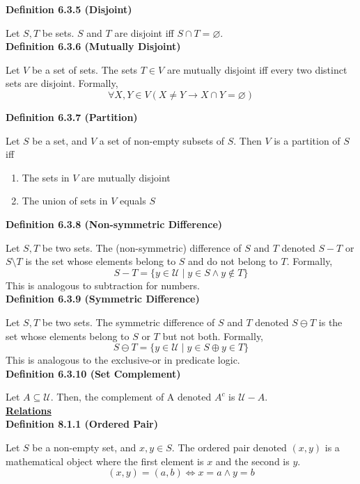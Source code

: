 \documentclass[a4paper]{article}
\newcommand{\heading}[1]{{\small\underline{\textbf{#1}}}}
\newcommand{\subheading}[1]{{\scriptsize\textbf{#1}}}
\begin{document}
\begin{multicols*}{4}
\subheading{Definition 6.3.5 (Disjoint)}

Let $S, T$ be sets. $S$ and $T$ are disjoint iff $S \cap T = \varnothing$.\\

\subheading{Definition 6.3.6 (Mutually Disjoint)}

Let $V$ be a set of sets. The sets $T \in V$ are mutually disjoint iff every two
distinct sets are disjoint. Formally,
$$\forall X, Y \in V (X \neq Y \rightarrow X \cap Y = \varnothing)$$

\subheading{Definition 6.3.7 (Partition)}

Let $S$ be a set, and $V$ a set of non-empty subsets of $S$. Then $V$ is a
partition of $S$ iff
\begin{enumerate} \itemsep -0.5em
  \item The sets in $V$ are mutually disjoint
  \item The union of sets in $V$ equals $S$
\end{enumerate}

\subheading{Definition 6.3.8 (Non-symmetric Difference)}

Let $S, T$ be two sets. The (non-symmetric) difference of $S$ and $T$ denoted
$S-T$ or $S\setminus T$ is the set whose elements belong to $S$ and do not
belong to $T$. Formally,
$$S - T = \{y \in \mathcal{U}\;|\;y \in S \land y \not\in T \}$$
This is analogous to subtraction for numbers.\\

\subheading{Definition 6.3.9 (Symmetric Difference)}

Let $S, T$ be two sets. The symmetric difference of $S$ and $T$ denoted $S
\ominus T$ is the set whose elements belong to $S$ or $T$ but not both.
Formally,
$$S \ominus T = \{y \in \mathcal{U}\;|\;y \in S \oplus y \in T \}$$
This is analogous to the exclusive-or in predicate logic.\\

\subheading{Definition 6.3.10 (Set Complement)}

Let $A \subseteq \mathcal{U}$. Then, the complement of A denoted $A^c$ is
$\mathcal{U}-A$.\\

\heading{Relations}\\

\subheading{Definition 8.1.1 (Ordered Pair)}

Let $S$ be a non-empty set, and $x, y \in S$. The ordered pair denoted $(x, y)$
is a mathematical object where the first element is $x$ and the second is $y$.
$$(x, y) = (a, b) \iff x = a \land y = b$$


\end{multicols*}
\end{document}
